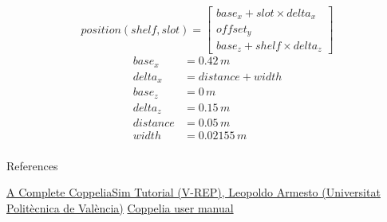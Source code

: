 \documentclass[12pt]{beamer}
\begin{document}
\begin{frame}
\[
position(shelf, slot) = 
\begin{bmatrix}
base_x + slot \times delta_x\\
offset_y \\
base_z + shelf \times delta_z
\end{bmatrix}
\]
\[
\begin{aligned}
base_x   &= 0.42 \, m\\
delta_x  &= distance + width\\
base_z   &= 0 \, m\\
delta_z  &= 0.15 \, m\\
distance &= 0.05 \, m\\
width    &= 0.02155 \, m\\
\end{aligned}
\]
\end{frame}

\begin{frame}[noframenumbering]{References}
\begin{thebibliography}{}
\href{https://www.youtube.com/watch?v=PwGY8PxQOXY&list=PLjzuoBhdtaXOoqkJUqhYQletLLnJP8vjZ}{A Complete CoppeliaSim Tutorial (V-REP), Leopoldo Armesto (Universitat Politècnica de València)}
\href{https://coppeliarobotics.com/helpFiles/index.html}{Coppelia user manual}

\end{thebibliography}
\end{frame}
\end{document}
